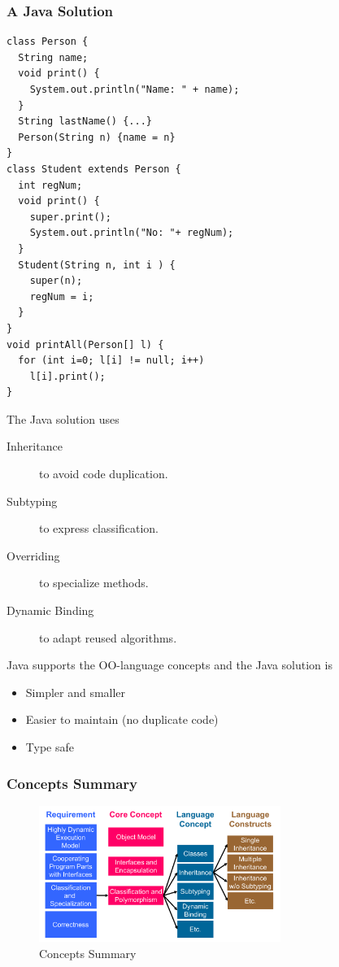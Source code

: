 \subsubsection{A Java Solution}
\lstset{language=Java}
\begin{lstlisting}
class Person {
  String name;
  void print() {
    System.out.println("Name: " + name);
  }
  String lastName() {...}
  Person(String n) {name = n}
}
class Student extends Person {
  int regNum;
  void print() {
    super.print();
    System.out.println("No: "+ regNum);
  }
  Student(String n, int i ) {
    super(n);
    regNum = i;
  }
}
void printAll(Person[] l) {
  for (int i=0; l[i] != null; i++)
    l[i].print();
}
\end{lstlisting}

The Java solution uses
\begin{description}
 \item[Inheritance] to avoid code duplication.
 \item[Subtyping] to express classification.
 \item[Overriding] to specialize methods.
 \item[Dynamic Binding] to adapt reused algorithms.
\end{description}
Java supports the OO-language concepts and the Java solution is
\begin{itemize}
 \item Simpler and smaller
 \item Easier to maintain (no duplicate code)
 \item Type safe
\end{itemize}

\subsubsection{Concepts Summary}
\begin{figure}[H]
  \centering
    \includegraphics[width=0.7\textwidth]{img/01_concepts_summary}
      \caption{Concepts Summary}
\end{figure}

